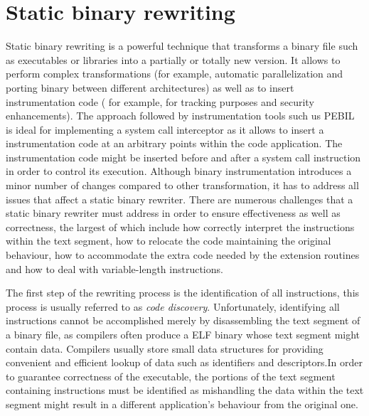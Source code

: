  
\section{Static binary rewriting}
\label{static_rewriting}

Static binary rewriting  is a powerful technique that transforms a binary file such as executables or libraries into a partially or totally new version. It allows to perform complex transformations (for example, automatic parallelization and porting binary between different architectures) as well as to insert instrumentation code ( for example, for tracking purposes and security enhancements). The approach followed by instrumentation tools such us PEBIL \cite{PEBIL} is ideal for implementing a system call interceptor as it allows to insert a instrumentation code at an arbitrary points within the code application. The instrumentation code might be inserted before and after a system call instruction in order to control its execution. Although binary instrumentation introduces a minor number of changes compared to other transformation, it has to address all issues that affect a static binary rewriter. There are numerous challenges that a static binary rewriter must address in order to ensure effectiveness as well as correctness, the largest of which include how correctly interpret the instructions within the text segment, how to relocate the code maintaining the original behaviour,  how to accommodate the extra code needed by the extension routines and how to deal with variable-length instructions. 

The first step of the rewriting process is the identification of all instructions, this process is usually referred to as \emph{code discovery}. Unfortunately, identifying all instructions cannot be accomplished merely by disassembling the text segment of a binary file, as compilers often produce a ELF binary whose text segment might contain data. Compilers usually store small data structures for providing convenient and efficient lookup of data such as identifiers and descriptors.In order to guarantee correctness of the executable, the portions of the text segment containing instructions must be identified as mishandling the data within the text segment might result in a different application's behaviour from the original one.

